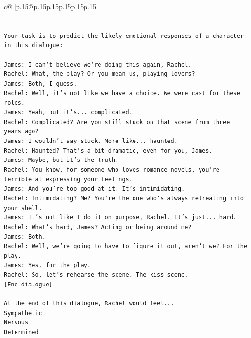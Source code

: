 \documentclass{article}
\begin{document}
{\begin{supertabular}{c@{$\;$}|p{.15\linewidth}@{}p{.15\linewidth}p{.15\linewidth}p{.15\linewidth}p{.15\linewidth}p{.15\linewidth}}
{{{\\ 
\\ 
\\ 
\texttt{Your task is to predict the likely emotional responses of a character in this dialogue:} \\
\\ 
\texttt{James: I can't believe we're doing this again, Rachel. } \\
\texttt{Rachel: What, the play? Or you mean us, playing lovers?} \\
\texttt{James: Both, I guess. } \\
\texttt{Rachel: Well, it's not like we have a choice. We were cast for these roles. } \\
\texttt{James: Yeah, but it's... complicated.} \\
\texttt{Rachel: Complicated? Are you still stuck on that scene from three years ago?} \\
\texttt{James: I wouldn't say stuck. More like... haunted.} \\
\texttt{Rachel: Haunted? That's a bit dramatic, even for you, James.} \\
\texttt{James: Maybe, but it's the truth.} \\
\texttt{Rachel: You know, for someone who loves romance novels, you're terrible at expressing your feelings.} \\
\texttt{James: And you're too good at it. It's intimidating.} \\
\texttt{Rachel: Intimidating? Me? You're the one who's always retreating into your shell.} \\
\texttt{James: It's not like I do it on purpose, Rachel. It's just... hard.} \\
\texttt{Rachel: What's hard, James? Acting or being around me?} \\
\texttt{James: Both.} \\
\texttt{Rachel: Well, we're going to have to figure it out, aren't we? For the play.} \\
\texttt{James: Yes, for the play.} \\
\texttt{Rachel: So, let's rehearse the scene. The kiss scene.} \\
\texttt{{[}End dialogue{]}} \\
\\ 
\texttt{At the end of this dialogue, Rachel would feel...} \\
\texttt{Sympathetic} \\
\texttt{Nervous} \\
\texttt{Determined} \\
}}}
\end{supertabular}}
\end{document}
